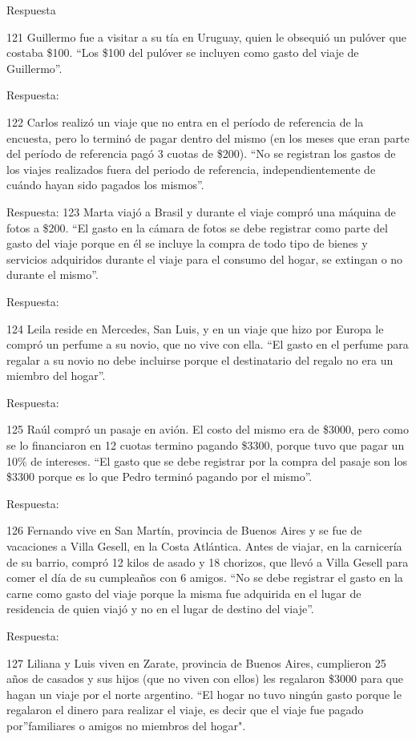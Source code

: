 \documentclass[
  openany]{book}
\begin{document}
Respuesta

121 Guillermo fue a visitar a su tía en Uruguay, quien le obsequió un pulóver que costaba \$100. ``Los \$100 del pulóver se incluyen como gasto del viaje de Guillermo''.

Respuesta:

122 Carlos realizó un viaje que no entra en el período de referencia de la encuesta, pero lo terminó de pagar dentro del mismo (en los meses que eran parte del período de referencia pagó 3 cuotas de \$200). ``No se registran los gastos de los viajes realizados fuera del periodo de referencia, independientemente de cuándo hayan sido pagados los mismos''.

Respuesta: 123 Marta viajó a Brasil y durante el viaje compró una máquina de fotos a \$200. ``El gasto en la cámara de fotos se debe registrar como parte del gasto del viaje porque en él se incluye la compra de todo tipo de bienes y servicios adquiridos durante el viaje para el consumo del hogar, se extingan o no durante el mismo''.

Respuesta:

124 Leila reside en Mercedes, San Luis, y en un viaje que hizo por Europa le compró un perfume a su novio, que no vive con ella. ``El gasto en el perfume para regalar a su novio no debe incluirse porque el destinatario del regalo no era un miembro del hogar''.

Respuesta:

125 Raúl compró un pasaje en avión. El costo del mismo era de \$3000, pero como se lo financiaron en 12 cuotas termino pagando \$3300, porque tuvo que pagar un 10\% de intereses. ``El gasto que se debe registrar por la compra del pasaje son los \$3300 porque es lo que Pedro terminó pagando por el mismo''.

Respuesta:

126 Fernando vive en San Martín, provincia de Buenos Aires y se fue de vacaciones a Villa Gesell, en la Costa Atlántica. Antes de viajar, en la carnicería de su barrio, compró 12 kilos de asado y 18 chorizos, que llevó a Villa Gesell para comer el día de su cumpleaños con 6 amigos. ``No se debe registrar el gasto en la carne como gasto del viaje porque la misma fue adquirida en el lugar de residencia de quien viajó y no en el lugar de destino del viaje''.

Respuesta:

127 Liliana y Luis viven en Zarate, provincia de Buenos Aires, cumplieron 25 años de casados y sus hijos (que no viven con ellos) les regalaron \$3000 para que hagan un viaje por el norte argentino. ``El hogar no tuvo ningún gasto porque le regalaron el dinero para realizar el viaje, es decir que el viaje fue pagado por''familiares o amigos no miembros del hogar".
\end{document}

